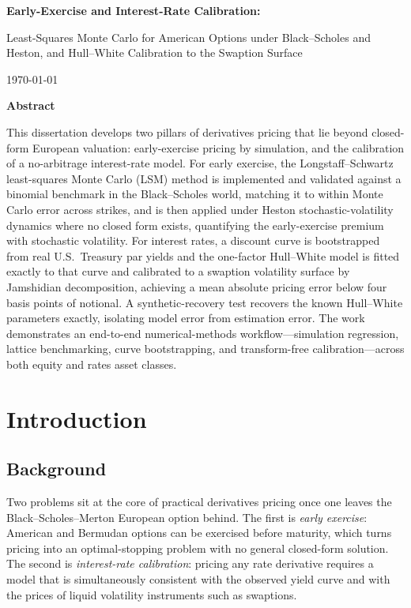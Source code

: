 \documentclass[11pt,a4paper]{report}
\begin{document}
\begin{titlepage}
\centering
\vspace*{3cm}
{\LARGE\bfseries Early-Exercise and Interest-Rate Calibration:\par}
\vspace{0.5cm}
{\large Least-Squares Monte Carlo for American Options under Black--Scholes and
Heston, and Hull--White Calibration to the Swaption Surface\par}
\vspace{2.5cm}
{\large \today\par}
\end{titlepage}

\thispagestyle{plain}
\begin{center}\textbf{\large Abstract}\end{center}
\noindent This dissertation develops two pillars of derivatives pricing that lie
beyond closed-form European valuation: early-exercise pricing by simulation, and
the calibration of a no-arbitrage interest-rate model. For early exercise, the
Longstaff--Schwartz least-squares Monte Carlo (LSM) method is implemented and
validated against a binomial benchmark in the Black--Scholes world, matching it to
within Monte Carlo error across strikes, and is then applied under Heston
stochastic-volatility dynamics where no closed form exists, quantifying the
early-exercise premium with stochastic volatility. For interest rates, a discount
curve is bootstrapped from real U.S.\ Treasury par yields and the one-factor
Hull--White model is fitted exactly to that curve and calibrated to a swaption
volatility surface by Jamshidian decomposition, achieving a mean absolute pricing
error below four basis points of notional. A synthetic-recovery test recovers the
known Hull--White parameters exactly, isolating model error from estimation error.
The work demonstrates an end-to-end numerical-methods workflow---simulation
regression, lattice benchmarking, curve bootstrapping, and transform-free
calibration---across both equity and rates asset classes.

\newpage
\tableofcontents
\newpage

\chapter{Introduction}

\section{Background}
Two problems sit at the core of practical derivatives pricing once one leaves the
Black--Scholes--Merton European option behind. The first is \emph{early exercise}:
American and Bermudan options can be exercised before maturity, which turns pricing
into an optimal-stopping problem with no general closed-form solution. The second is
\emph{interest-rate calibration}: pricing any rate derivative requires a model that
is simultaneously consistent with the observed yield curve and with the prices of
liquid volatility instruments such as swaptions.
\end{document}
